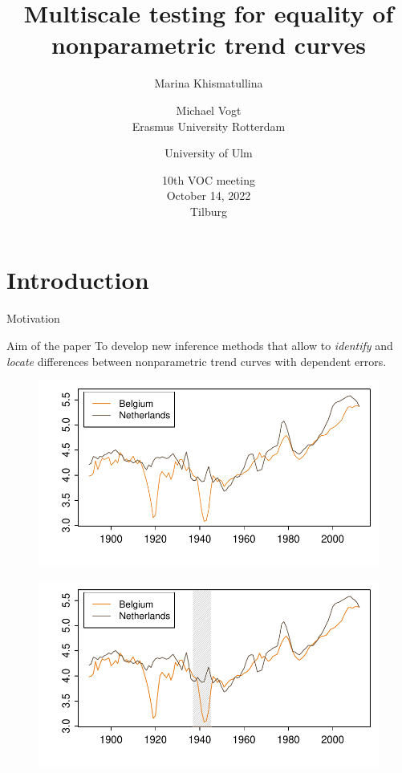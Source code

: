 \documentclass[10pt, handout]{beamer}
\title{Multiscale testing for equality of nonparametric trend curves}
\date{\vspace{3mm}10th VOC meeting\\ October 14, 2022 \\ Tilburg}
\author{Marina Khismatullina \and \hspace{11mm} Michael Vogt \\ Erasmus University Rotterdam \and University of Ulm}
\begin{document}
\maketitle


\section{Introduction}


\begin{frame}{Motivation}

{ \begin{block}{Aim of the paper}
	To develop new inference methods that allow to \textit{identify} and \textit{locate} differences between nonparametric trend curves with dependent errors.
\end{block}}
	{\begin{figure}
    		\centering
    		\includegraphics[height=0.45\textheight]{plots/hp_BEL_NLD.pdf}
  	\end{figure}}
	{\onslide<3>
	\vspace{-46,81mm}
	\begin{figure}
    		\centering
    		\includegraphics[height=0.45\textheight]{plots/hp_BEL_NLD_1.pdf}

\end{figure}}
\end{frame}
\end{document}
